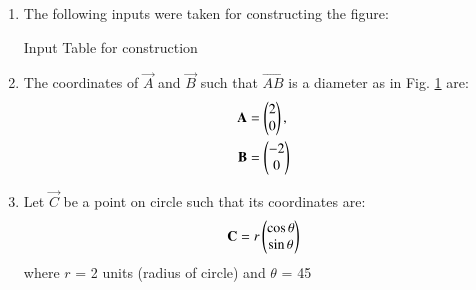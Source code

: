 \renewcommand{\theequation}{\theenumi}
\begin{enumerate}[label=\thesection.\arabic*.,ref=\thesection.\theenumi]

\begin{figure}[!ht]
\centering
\resizebox{\columnwidth}{!}{}
\caption{Using Latex-Tikz}
\label{fig:circle_latex}	
\end{figure}
%
%
%
\item The following inputs were taken for constructing the figure:
%
\begin{table}[ht!]
\centering

\caption{Input Table for construction}
\label{table:table1}	
\end{table}
\item The coordinates of  $\vec{A}$ and  $\vec{B}$ such that  $\vec{AB}$ is a diameter as in Fig. \ref{fig:circle_latex} are:
\\
%
\begin{align}
\mathbf{A} &= \begin{pmatrix}2\\0\end{pmatrix} ,
\label{eq:constr_a}
\\
 \mathbf{B} &= \begin{pmatrix}-2\\0\end{pmatrix} 
\label{eq:constr_b}
\end{align}

\item 
Let $\vec{C}$ be a point on circle such that its coordinates are:
\begin{align}
\mathbf{C}= r\begin{pmatrix}\cos\theta\\\sin\theta\end{pmatrix}
\label{eq:constr_cgen}
\end{align}
where $r$ = 2 units (radius of circle) and $\theta$ = 45\degree \\


\end{enumerate}
